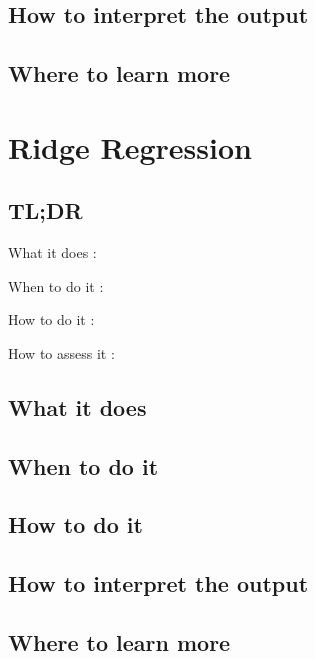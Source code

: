 \documentclass[
]{book}
\begin{document}
\hypertarget{how-to-interpret-the-output-12}{%
\section{How to interpret the output}\label{how-to-interpret-the-output-12}}

\hypertarget{where-to-learn-more-12}{%
\section{Where to learn more}\label{where-to-learn-more-12}}

\hypertarget{ridge-regression}{%
\chapter{Ridge Regression}\label{ridge-regression}}

\hypertarget{tldr-13}{%
\section{TL;DR}\label{tldr-13}}

What it does
:

When to do it
:

How to do it
:

How to assess it
:

\hypertarget{what-it-does-13}{%
\section{What it does}\label{what-it-does-13}}

\hypertarget{when-to-do-it-13}{%
\section{When to do it}\label{when-to-do-it-13}}

\hypertarget{how-to-do-it-13}{%
\section{How to do it}\label{how-to-do-it-13}}

\hypertarget{how-to-interpret-the-output-13}{%
\section{How to interpret the output}\label{how-to-interpret-the-output-13}}

\hypertarget{where-to-learn-more-13}{%
\section{Where to learn more}\label{where-to-learn-more-13}}
\end{document}

